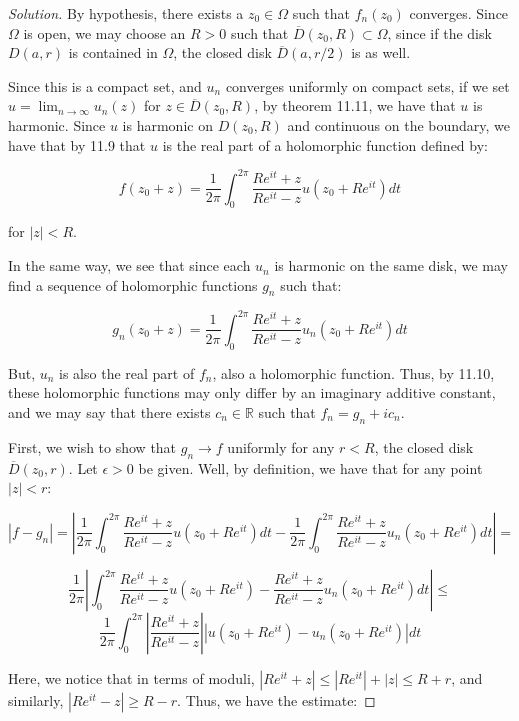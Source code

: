 \documentclass[10pt]{article}
\begin{document}
\begin{proof}[Solution]

By hypothesis, there exists a $z_0 \in \Omega$ such that $f_n(z_0)$ converges. Since $\Omega$ is open, we may choose an $R > 0$ such that $\overline{D}(z_0,R) \subset \Omega$, since if the disk $D(a,r)$ is contained in $\Omega$, the closed disk $\overline{D}(a,r/2)$ is as well.

Since this is a compact set, and $u_n$ converges uniformly on compact sets, if we set $u = \lim_{n \to \infty} u_n(z)$ for $z \in \overline{D}(z_0, R)$, by theorem 11.11, we have that $u$ is harmonic. Since $u$ is harmonic on $D(z_0,R)$ and continuous on the boundary, we have that by 11.9 that $u$ is the real part of a holomorphic function defined by:

$$ f(z_0 + z) = \frac{1}{2\pi} \int_0^{2\pi} \frac{R e^{it} + z}{R e^{it} - z} u(z_0 + Re^{it}) dt$$

for $|z| < R$.

In the same way, we see that since each $u_n$ is harmonic on the same disk, we may find a sequence of holomorphic functions $g_n$ such that:

$$ g_n(z_0 + z) = \frac{1}{2\pi} \int_0^{2\pi} \frac{R e^{it} + z}{R e^{it} - z} u_n(z_0 + Re^{it}) dt$$

But, $u_n$ is also the real part of $f_n$, also a holomorphic function. Thus, by 11.10, these holomorphic functions may only differ by an imaginary additive constant, and we may say that there exists $c_n \in \mathbb{R}$ such that $f_n = g_n + i c_n$.

First, we wish to show that $g_n \to f$ uniformly for any $r < R$, the closed disk $\overline{D}(z_0,r)$. Let $\epsilon > 0$ be given. Well, by definition, we have that for any point $|z| < r$:

$$ |f - g_n | =  \left |\frac{1}{2\pi} \int_0^{2\pi} \frac{R e^{it} + z}{R e^{it} - z} u(z_0 + Re^{it}) dt - \frac{1}{2\pi} \int_0^{2\pi} \frac{R e^{it} + z}{R e^{it} - z} u_n(z_0 + Re^{it}) dt\right| = $$

$$ \frac{1}{2\pi} \left| \int_0^{2\pi}  \frac{R e^{it} + z}{R e^{it} - z} u(z_0 + Re^{it})  -  \frac{R e^{it} + z}{R e^{it} - z} u_n(z_0 + Re^{it}) dt \right| \leq $$
$$ \frac{1}{2\pi}  \int_0^{2\pi} \left|  \frac{R e^{it} + z}{R e^{it} - z} \right| \left|  u(z_0 + Re^{it}) -  u_n(z_0 + Re^{it})\right| dt$$

Here, we notice that in terms of moduli, $|Re^{it} + z|  \leq |Re^{it}| + |z| \leq R + r$, and similarly, $|Re^{it} - z| \geq R - r$. Thus, we have the estimate:


\end{proof}
\end{document}
